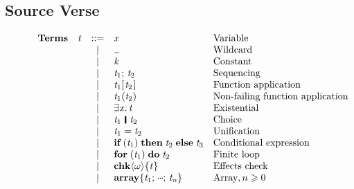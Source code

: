 





\subsection{Source Verse}

\begin{figure}
$$
\begin{array}{lrcll}
\textbf{Terms} & \ensuremath{\Varid{t}} & ::= & \ensuremath{\Varid{x}}               & \text{Variable} \\
&      & \vb & \ensuremath{\anonymous }               & \text{Wildcard} \\
&      & \vb & \ensuremath{\Varid{k}}               & \text{Constant} \\
&      & \vb & \ensuremath{\Varid{t}_{\mathrm{1}};\,\Varid{t}_{\mathrm{2}}}       & \text{Sequencing} \\
&      & \vb & \ensuremath{\Varid{t}_{\mathrm{1}} [\mskip1.5mu \Varid{t}_{\mathrm{2}}\mskip1.5mu]}       & \text{Function application} \\
&      & \vb & \ensuremath{\Varid{t}_{\mathrm{1}} (\Varid{t}_{\mathrm{2}})}       & \text{Non-failing function application} \\
&      & \vb & \ensuremath{\exists\Varid{x}.\,\Varid{t}}         & \text{Existential} \\
&      & \vb & \ensuremath{\Varid{t}_{\mathrm{1}}\hspace{0.19em}\mathop{\rule[-0.1em]{0.15em}{0.75em}}\hspace{0.2em}\Varid{t}_{\mathrm{2}}} & \text{Choice} \\
&      & \vb & \ensuremath{\Varid{t}_{\mathrm{1}}\mathrel{=}\Varid{t}_{\mathrm{2}}}       & \text{Unification} \\
&      & \vb & \ensuremath{\textbf{if}\;(\Varid{t}_{\mathrm{1}})\;\textbf{then}\;\Varid{t}_{\mathrm{2}}\;\textbf{else}\;\Varid{t}_{\mathrm{3}}} & \text{Conditional expression} \\
&      & \vb & \ensuremath{\textbf{for}\;(\Varid{t}_{\mathrm{1}})\;\textbf{do}\;\Varid{t}_{\mathrm{2}}}     & \text{Finite loop} \\
&      & \vb & \ensuremath{{\bf chk}\langle\omega\rangle\{\Varid{t}\}}     & \text{Effects check} \\
&      & \vb & \ensuremath{\textbf{array}\{\Varid{t}_{\mathrm{1}};\,\mydots;\,\Varid{t}_{\Varid{n}}\}} & \text{Array}, n \geq 0 \\

\end{array}$$
\end{figure}
